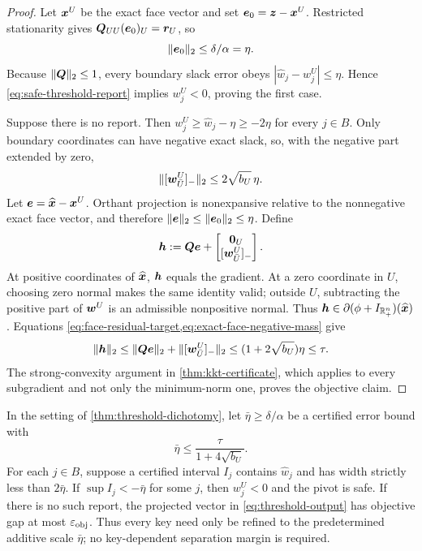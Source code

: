 \begin{proof}
Let $\bm{x}^U$ be the exact face vector and set
$\bm{e}_0=\bm{z}-\bm{x}^U$.  Restricted stationarity gives
$\bm{Q}_{UU}(\bm{e}_0)_U=\bm{r}_U$, so
\begin{equation}
 \lVert\bm{e}_0\rVert_2\leq\delta/\alpha=\eta.
 \label{eq:face-error-bound}
\end{equation}
Because $\lVert\bm{Q}\rVert_2\leq1$, every boundary slack error obeys
$|\widehat w_j-w_j^U|\leq\eta$.  Hence
\cref{eq:safe-threshold-report} implies $w_j^U<0$, proving the first case.

Suppose there is no report.  Then
$w_j^U\geq\widehat w_j-\eta\geq-2\eta$ for every $j\in B$.
Only boundary coordinates can have negative exact slack, so, with the negative
part extended by zero,
\begin{equation}
 \lVert[\bm{w}^U_{\bar U}]_-\rVert_2\leq2\sqrt{b_U}\,\eta.
 \label{eq:exact-face-negative-mass}
\end{equation}
Let $\bm{e}=\widehat{\bm{x}}-\bm{x}^U$.  Orthant projection is nonexpansive relative to
the nonnegative exact face vector, and therefore
$\lVert\bm{e}\rVert_2\leq\lVert\bm{e}_0\rVert_2\leq\eta$.  Define
\begin{equation}
 \vh:=\mQ\ve+
 \begin{bmatrix}
  \vzero_U\\ [\vw^U_{\bar U}]_-
 \end{bmatrix}.
 \label{eq:constructed-subgradient}
\end{equation}
At positive coordinates of $\widehat{\bm{x}}$, $\bm{h}$ equals the gradient.  At a
zero coordinate in $U$, choosing zero normal makes the same identity valid;
outside $U$, subtracting the positive part of $\bm{w}^U$ is an admissible
nonpositive normal.  Thus
$\bm{h}\in\partial(\phi+I_{\mathbb{R}_+^n})(\widehat{\bm{x}})$.  Equations
\cref{eq:face-residual-target,eq:exact-face-negative-mass} give
\[
 \lVert\bm{h}\rVert_2
 \leq\lVert\bm{Q}\bm{e}\rVert_2+\lVert[\bm{w}^U_{\bar U}]_-\rVert_2
 \leq(1+2\sqrt{b_U})\eta
 \leq\tau.
\]
The strong-convexity argument in \cref{thm:kkt-certificate}, which applies to
every subgradient and not only the minimum-norm one, proves the objective
claim.
\end{proof}

\begin{corollary}
\label{cor:interval-threshold}
In the setting of \cref{thm:threshold-dichotomy}, let
$\bar\eta\geq\delta/\alpha$ be a certified error bound with
\begin{equation}
 \bar\eta\leq\frac{\tau}{1+4\sqrt{b_U}}.
 \label{eq:interval-residual-target}
\end{equation}
For each $j\in B$, suppose a certified interval $I_j$ contains
$\widehat w_j$ and has width strictly less than $2\bar\eta$.  If
$\sup I_j<-\bar\eta$ for some $j$, then $w_j^U<0$ and the pivot is safe.  If
there is no such report, the projected vector in
\cref{eq:threshold-output} has objective gap at most $\varepsilon_{\mathrm{obj}}$.
Thus every key need only be refined to the predetermined additive scale
$\bar\eta$; no key-dependent separation margin is required.
\end{corollary}

